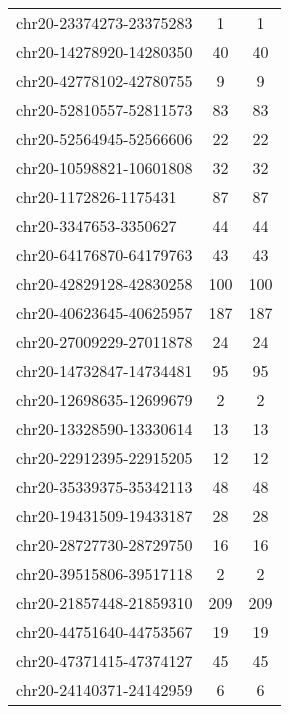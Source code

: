 \begin{longtable}{lSS}
	chr20-23374273-23375283 & 1    & 1                               \\
	chr20-14278920-14280350 & 40   & 40                              \\
	chr20-42778102-42780755 & 9    & 9                               \\
	chr20-52810557-52811573 & 83   & 83                              \\
	chr20-52564945-52566606 & 22   & 22                              \\
	chr20-10598821-10601808 & 32   & 32                              \\
	chr20-1172826-1175431   & 87   & 87                              \\
	chr20-3347653-3350627   & 44   & 44                              \\
	chr20-64176870-64179763 & 43   & 43                              \\
	chr20-42829128-42830258 & 100  & 100                             \\
	chr20-40623645-40625957 & 187  & 187                             \\
	chr20-27009229-27011878 & 24   & 24                              \\
	chr20-14732847-14734481 & 95   & 95                              \\
	chr20-12698635-12699679 & 2    & 2                               \\
	chr20-13328590-13330614 & 13   & 13                              \\
	chr20-22912395-22915205 & 12   & 12                              \\
	chr20-35339375-35342113 & 48   & 48                              \\
	chr20-19431509-19433187 & 28   & 28                              \\
	chr20-28727730-28729750 & 16   & 16                              \\
	chr20-39515806-39517118 & 2    & 2                               \\
	chr20-21857448-21859310 & 209  & 209                             \\
	chr20-44751640-44753567 & 19   & 19                              \\
	chr20-47371415-47374127 & 45   & 45                              \\
	chr20-24140371-24142959 & 6    & 6                               \\

\end{longtable}
